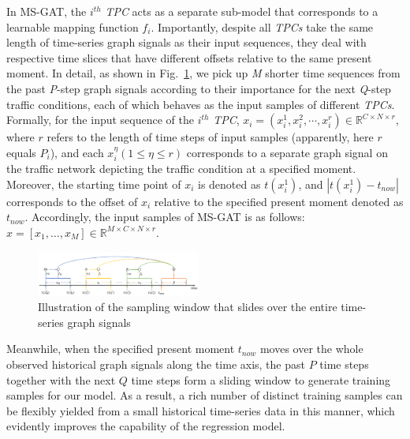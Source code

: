 In MS-GAT, the $i^{th}$ \textit{TPC} acts as a separate sub-model that corresponds to a learnable mapping function $f_i$. Importantly, despite all \textit{TPCs} take the same length of time-series graph signals as their input sequences, they deal with respective time slices that have different offsets relative to the same present moment. In detail, as shown in Fig.~\ref{fig:sampling}, we pick up \textit{M} shorter time sequences from the past \textit{P}-step graph signals according to their importance for the next \textit{Q}-step traffic conditions, each of which behaves as the input samples of different \textit{TPCs}. Formally, for the input sequence of the $i^{th}$ \textit{TPC}, $x_i=(x_i^1, x_i^2, \cdots ,x_i^r) \in \mathbb{R}^{C \times N \times r}$, where $r$ refers to the length of time steps of input samples (apparently, here $r$ equals  $P_i$), and each $x_i^\eta (1 \leq \eta \leq r)$ corresponds to a separate graph signal on the traffic network depicting the traffic condition at a specified moment. Moreover, the starting time point of $x_i$ is denoted as $t(x_i^1)$, and $|t(x_i^1) - t_{now}|$ corresponds to the offset of $x_i$ relative to the specified present moment denoted as $t_{now}$. Accordingly, the input samples of MS-GAT is as follows: $x = [x_1, \dots , x_M] \in \mathbb{R}^{M \times C \times N \times r}$.

\begin{figure}[!ht]
    \centering
    \includegraphics[width=0.48\textwidth]{pictures/Sampling.png}
    \caption{Illustration of the sampling window that slides over the entire time-series graph signals}
    \label{fig:sampling}
\end{figure}

Meanwhile, when the specified present moment $t_{now}$ moves over the whole observed historical graph signals along the time axis, the past $P$ time steps together with the next  $Q$ time steps form a sliding window to generate training samples for our model. As a result, a rich number of distinct training samples can be flexibly yielded from a small historical time-series data in this manner, which evidently improves the capability of the regression model.

